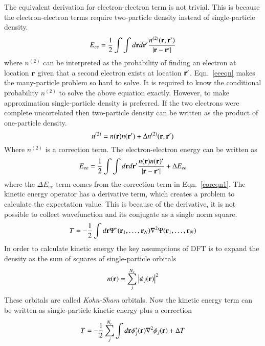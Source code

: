 The equivalent derivation for electron-electron term is not trivial. This is because the electron-electron terms require two-particle density instead of single-particle density.
\begin{equation}\label{eeeqn}
E_{ee} = \frac{1}{2}\int\int d\vb{r}d\vb{r}' \frac{n^{(2)}(\vb{r},\vb{r}')}{\abs{\vb{r}-\vb{r}'}}
\end{equation}
where $n^{(2)}$ can be interpreted as the probability of finding an electron at location $\vb{r}$ given that a second electron exists at location $\vb{r}'$. Eqn.~\eqref{eeeqn} makes the many-particle problem so hard to solve. It is required to know the conditional probability $n^{(2)}$ to solve the above equation exactly. However, to make approximation single-particle density is preferred. If the two electrons were complete uncorrelated then two-particle density can be written as the product of one-particle density.
\begin{equation}\label{coreqn1}
n^{(2)} = n(\vb{r})n(\vb{r}') + \Delta n^{(2)}(\vb{r},\vb{r}')
\end{equation}
Where $n^{(2)}$ is a correction term. The electron-electron energy can be written as
\begin{equation}
 E_{ee} = \frac{1}{2}\int\int d\vb{r}d\vb{r}' \frac{n(\vb{r})n(\vb{r})'}{\abs{\vb{r}-\vb{r}'}} + \Delta E_{ee}
\end{equation}
where the $\Delta E_{ee}$ term comes from the correction term in Eqn.~\eqref{coreqn1}.
The kinetic energy operator has a derivative term, which creates a problem to calculate the expectation value. This is because of the derivative, it is not possible to collect wavefunction and its conjugate as a single norm square.
\begin{equation}\label{keeqn}
T = -\frac{1}{2}\int d\vb{r} \Psi^{\ast}(\vb{r}_1,\dots,\vb{r}_N) \nabla^2 \Psi(\vb{r}_1,\dots,\vb{r}_N)
\end{equation}
In order to calculate kinetic energy the key assumptions of DFT is to expand the density as the sum of squares of single-particle orbitals
\begin{equation}
n(\vb{r}) = \sum_j^{N_e} \abs{\phi_j(\vb{r})}^2
\end{equation}
These orbitals are called \textit{Kohn-Sham} orbitals. Now the kinetic energy term can be written as single-particle kinetic energy plus a correction
\begin{equation}
T = -\frac{1}{2}\sum_j^{N_e} \int d\vb{r} \phi^{\ast}_j (\vb{r})\nabla^2 \phi_j(\vb{r}) + \Delta T
\end{equation}
